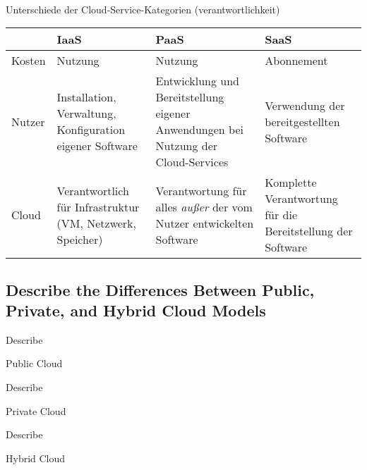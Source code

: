 \documentclass{scrartcl}
\newenvironment{flashcard}[2][]{%
    #1
    \vfill
    \centerline{\Large{#2}}
    \vfill
    \newpage
}
{\newpage}
\newcommand{\subsectioncard}[1]{
    \vspace*{\stretch{1}}
    \subsection{#1}
    \vspace*{\stretch{1}}
    \pagebreak
}
\begin{document}
    \begin{flashcard}[\ ]{Unterschiede der Cloud-Service-Kategorien (verantwortlichkeit)}
        \begin{tabular}{l|p{34mm}p{34mm}p{34mm}}
                 & \textbf{IaaS}                                             & \textbf{PaaS}                                                                     & \textbf{SaaS} \\
          \hline
          Kosten & Nutzung                                                   & Nutzung                                                                           & Abonnement                                                  \\
          Nutzer & Installation, Verwaltung, Konfiguration eigener Software  & Entwicklung und Bereitstellung eigener Anwendungen bei Nutzung der Cloud-Services & Verwendung der bereitgestellten Software                    \\
          Cloud  & Verantwortlich für Infrastruktur (VM, Netzwerk, Speicher) & Verantwortung für alles \emph{außer} der vom Nutzer entwickelten Software         & Komplette Verantwortung für die Bereitstellung der Software \\
        \end{tabular}
    \end{flashcard}
   

    \subsectioncard{Describe the Differences Between Public, Private, and Hybrid Cloud Models}

    \begin{flashcard}[Describe]{Public Cloud}

    \end{flashcard}

    \begin{flashcard}[Describe]{Private Cloud}

    \end{flashcard}

    \begin{flashcard}[Describe]{Hybrid Cloud}

    \end{flashcard}
\end{document}
